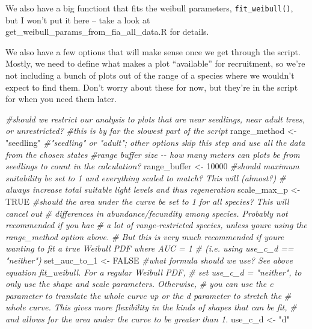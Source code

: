 \documentclass[
]{article}
\newenvironment{Shaded}{\begin{snugshade}}{\end{snugshade}}
\newcommand{\CommentTok}[1]{\textcolor[rgb]{0.56,0.35,0.01}{\textit{#1}}}
\newcommand{\ConstantTok}[1]{\textcolor[rgb]{0.56,0.35,0.01}{#1}}
\newcommand{\DecValTok}[1]{\textcolor[rgb]{0.00,0.00,0.81}{#1}}
\newcommand{\NormalTok}[1]{#1}
\newcommand{\OtherTok}[1]{\textcolor[rgb]{0.56,0.35,0.01}{#1}}
\newcommand{\StringTok}[1]{\textcolor[rgb]{0.31,0.60,0.02}{#1}}
\begin{document}
We also have a big functiont that fits the weibull parameters,
\texttt{fit\_weibull()}, but I won't put it here -- take a look at
get\_weibull\_params\_from\_fia\_all\_data.R for details.

We also have a few options that will make sense once we get through the
script. Mostly, we need to define what makes a plot ``available'' for
recruitment, so we're not including a bunch of plots out of the range of
a species where we wouldn't expect to find them. Don't worry about these
for now, but they're in the script for when you need them later.

\begin{Shaded}
\begin{Highlighting}[]
\CommentTok{\#should we restrict our analysis to plots that are near seedlings, near adult trees, or unrestricted?}
\CommentTok{\#this is by far the slowest part of the script}
\NormalTok{range\_method }\OtherTok{\textless{}{-}} \StringTok{"seedling"} \CommentTok{\#"seedling" or "adult"; other options skip this step and use all the data from the chosen states}
\CommentTok{\#range buffer size {-}{-} how many meters can plots be from seedlings to count in the calculation?}
\NormalTok{range\_buffer }\OtherTok{\textless{}{-}} \DecValTok{10000}
\CommentTok{\#should maximum suitability be set to 1 and everything scaled to match? This will (almost?)}
\CommentTok{\# always increase total suitable light levels and thus regeneration}
\NormalTok{scale\_max\_p }\OtherTok{\textless{}{-}} \ConstantTok{TRUE}
\CommentTok{\#should the area under the curve be set to 1 for all species? This will cancel out}
\CommentTok{\# differences in abundance/fecundity among species. Probably not recommended if you hae}
\CommentTok{\# a lot of range{-}restricted species, unless you\textquotesingle{}re using the range\_method option above.}
\CommentTok{\# But this is very much recommended if you\textquotesingle{}re wanting to fit a true Weibull PDF where AUC = 1 }
\CommentTok{\# (i.e. using use\_c\_d == "neither")}
\NormalTok{set\_auc\_to\_1 }\OtherTok{\textless{}{-}} \ConstantTok{FALSE}
\CommentTok{\#what formula should we use? See above equation fit\_weibull. For a regular Weibull PDF,}
\CommentTok{\# set use\_c\_d = "neither", to only use the shape and scale parameters. Otherwise,}
\CommentTok{\# you can use the c parameter to translate the whole curve up or the d parameter to stretch the}
\CommentTok{\# whole curve. This gives more flexibility in the kinds of shapes that can be fit,}
\CommentTok{\# and allows for the area under the curve to be greater than 1.}
\NormalTok{use\_c\_d }\OtherTok{\textless{}{-}} \StringTok{"d"}
\end{Highlighting}
\end{Shaded}
\end{document}
